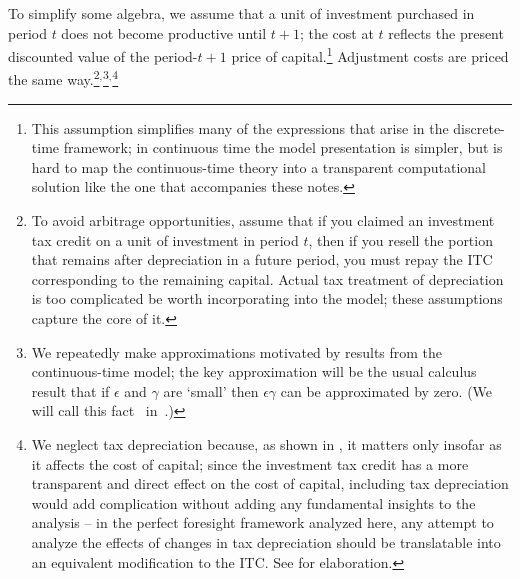 \documentclass[headings=optiontotocandhead,toc=flat]{handout}
\begin{document}
To simplify some algebra, we assume that a unit of investment purchased
in period $t$ does not become productive until $t+1$; the
cost at $t$ reflects the present discounted value of the
period-$t+1$ price of capital.\footnote{This assumption simplifies
  many of the expressions that arise in the discrete-time framework;
  in continuous time the model presentation is simpler, but is hard to map the continuous-time theory into a transparent
  computational solution like the one that accompanies these
  notes.}  Adjustment costs are priced the same way.\footnote{To avoid
  arbitrage opportunities, assume that if you claimed an investment
  tax credit on a unit of investment in period $t$, then if you resell
  the portion that remains after depreciation in a future period, you
  must repay the ITC corresponding to the remaining capital.  Actual
  tax treatment of depreciation is too complicated be worth
  incorporating into the model; these assumptions capture the core of
  it.}$^{,}$\footnote{We repeatedly make approximations motivated by
  results from the continuous-time model; the key
  approximation will be the usual calculus result that if $\epsilon$
  and $\gamma$ are `small' then $\epsilon\gamma$ can be approximated
  by zero.  (We will call this fact \SmallSmallZero~in~{\MathFactsList}.)}$^{,}$\footnote{We neglect tax depreciation because, as
  shown in , it matters only insofar as it
  affects the cost of capital; since the investment tax credit has a
  more transparent and direct effect on the cost of capital, including
  tax depreciation would add complication without adding any
  fundamental insights to the analysis -- in the perfect
  foresight framework analyzed here, any attempt to analyze the
  effects of changes in tax depreciation should be translatable into
  an equivalent modification to the ITC.  See \citet{hsITC} for
  elaboration.}

\medskip
\end{document}

